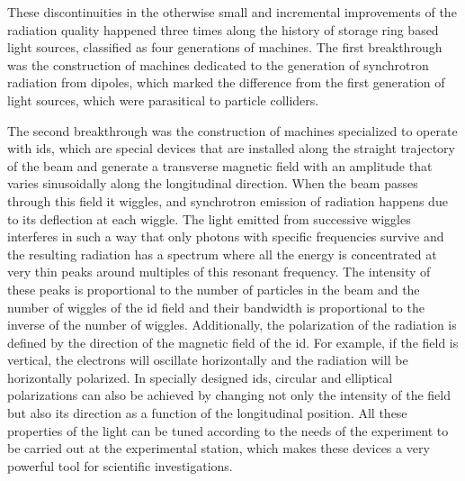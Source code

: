     These discontinuities in the otherwise small and incremental improvements of the radiation quality happened three times along the history of storage ring based light sources, classified as four generations of machines. The first breakthrough was the construction of machines dedicated to the generation of synchrotron radiation from dipoles, which marked the difference from the first generation of light sources, which were parasitical to particle colliders.

    The second breakthrough was the construction of machines specialized to operate with \glspl{id}, which are special devices that are installed along the straight trajectory of the beam and generate a transverse magnetic field with an amplitude that varies sinusoidally along the longitudinal direction. When the beam passes through this field it wiggles, and synchrotron emission of radiation happens due to its deflection at each wiggle. The light emitted from successive wiggles interferes in such a way that only photons with specific frequencies survive and the resulting radiation has a spectrum where all the energy is concentrated at very thin peaks around multiples of this resonant frequency. The intensity of these peaks is proportional to the number of particles in the beam and the number of wiggles of the \gls{id} field and their bandwidth is proportional to the inverse of the number of wiggles. Additionally, the polarization of the radiation is defined by the direction of the magnetic field of the \gls{id}. For example, if the field is vertical, the electrons will oscillate horizontally and the radiation will be horizontally polarized. In specially designed \glspl{id}, circular and elliptical polarizations can also be achieved by changing not only the intensity of the field but also its direction as a function of the longitudinal position. All these properties of the light can be tuned according to the needs of the experiment to be carried out at the experimental station, which makes these devices a very powerful tool for scientific investigations.

